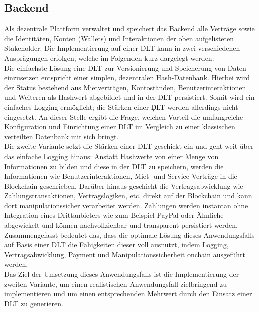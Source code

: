 \subsection{Backend}
\label{subsec:iot_usecase:solution:backend}
Als dezentrale Plattform verwaltet und speichert das Backend alle Verträge sowie die Identitäten, Konten (Wallets) und Interaktionen der oben aufgelisteten Stakeholder. Die Implementierung auf einer \ac{DLT} kann in zwei verschiedenen Ausprägungen erfolgen, welche im Folgenden kurz dargelegt werden:\\
Die einfachste Lösung eine \ac{DLT} zur Versionierung und Speicherung von Daten einzusetzen entspricht einer simplen, dezentralen Hash-Datenbank. Hierbei wird der Status bestehend aus Mietverträgen, Kontoständen, Benutzerinteraktionen und Weiteren als Hashwert abgebildet und in der \ac{DLT} persistiert. Somit wird ein einfaches Logging ermöglicht; die Stärken einer \c{DLT} werden allerdings nicht eingesetzt. An dieser Stelle ergibt die Frage, welchen Vorteil die umfangreiche Konfiguration und Einrichtung einer \ac{DLT} im Vergleich zu einer klassischen verteilten Datenbank mit sich bringt.\\
Die zweite Variante setzt die Stärken einer \ac{DLT} geschickt ein und geht weit über das einfache Logging hinaus: Anstatt Hashwerte von einer Menge von Informationen zu bilden und diese in der \ac{DLT} zu speichern, werden die Informationen wie Benutzerinteraktionen, Miet- und Service-Verträge in die Blockchain geschrieben. Darüber hinaus geschieht die Vertragsabwicklung wie Zahlungstransaktionen, Vertragslogiken, etc. direkt auf der Blockchain und kann dort manipulationssicher verarbeitet werden. Zahlungen werden instantan ohne Integration eines Drittanbieters wie zum Beispiel PayPal oder Ähnliche abgewickelt und können nachvollziehbar und transparent persistiert werden. Zusammengefasst bedeutet das, dass die optimale Lösung dieses Anwendungsfalls auf Basis einer \ac{DLT} die Fähigkeiten dieser voll ausnutzt, indem Logging, Vertragsabwicklung, Payment und Manipulationssicherheit onchain ausgeführt werden.\\
Das Ziel der Umsetzung dieses Anwendungsfalls ist die Implementierung der zweiten Variante, um einen realistischen Anwendungsfall zielbringend zu implementieren und um einen entsprechenden Mehrwert durch den Einsatz einer \ac{DLT} zu generieren.
